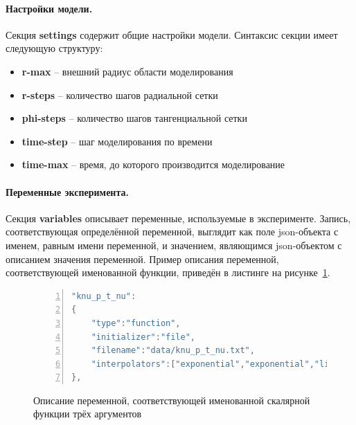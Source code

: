 \paragraph{Настройки модели.} Секция \textbf{settings} содержит общие настройки 
модели. Синтаксис секции имеет следующую структуру:
\begin{itemize}
    \item \textbf{r-max} -- внешний радиус области моделирования
    \item \textbf{r-steps} -- количество шагов радиальной сетки
    \item \textbf{phi-steps} -- количество шагов тангенциальной сетки
    \item \textbf{time-step} -- шаг моделирования по времени
    \item \textbf{time-max} -- время, до которого производится моделирование    
\end{itemize}

\paragraph{Переменные эксперимента.} Секция \textbf{variables} описывает 
переменные, используемые в эксперименте. Запись, соответствующая определённой 
переменной, выглядит как поле json-объекта с именем, равным имени переменной, и 
значением, являющимся json-объектом с описанием значения переменной. Пример 
описания переменной, соответствующей именованной функции, приведён в листинге 
на рисунке~\ref{fig:lstVariable}.

\begin{figure}
    \centering
    \begin{lstlisting}[language=java,frame=single,numbers=left,breaklines=true]
"knu_p_t_nu":
{
    "type":"function",
    "initializer":"file",
    "filename":"data/knu_p_t_nu.txt",
    "interpolators":["exponential","exponential","linear"]
},
    \end{lstlisting}
    \caption{Описание переменной, соответствующей именованной скалярной функции 
    трёх аргументов}
    \label{fig:lstVariable}
\end{figure}

